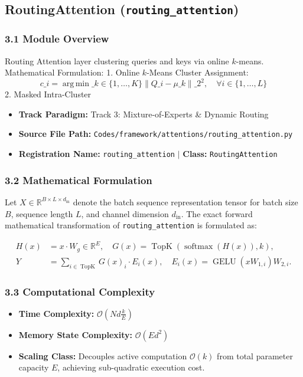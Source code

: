 \subsection{RoutingAttention (\texttt{routing\_attention})}
\label{sec:app_module_routing\_attention}

\subsubsection*{3.1 Module Overview}
Routing Attention layer clustering queries and keys via online $k$-means.  Mathematical Formulation:     1. Online $k$-Means Cluster Assignment:        $$c\_i = \operatorname{arg\,min}\_{k \in \{1, \dots, K\}} \|Q\_i - \mu\_k\|\_2^2, \quad \forall i \in \{1, \dots, L\}$$          2. Masked Intra-Cluster
\begin{itemize}
    \item \textbf{Track Paradigm:} Track 3: Mixture-of-Experts & Dynamic Routing
    \item \textbf{Source File Path:} \texttt{Codes/framework/attentions/routing\_attention.py}
    \item \textbf{Registration Name:} \texttt{routing\_attention} $\mid$ \textbf{Class:} \texttt{RoutingAttention}
\end{itemize}

\subsubsection*{3.2 Mathematical Formulation}
Let $X \in \mathbb{R}^{B \times L \times d_{\text{in}}}$ denote the batch sequence representation tensor for batch size $B$, sequence length $L$, and channel dimension $d_{\text{in}}$. The exact forward mathematical transformation of \texttt{routing\_attention} is formulated as:

\begin{align}
H(x) &= x \cdot W_g \in \mathbb{R}^{E}, \quad G(x) = \operatorname{TopK}\left(\operatorname{softmax}(H(x)), k\right), \\
Y &= \sum_{i \in \operatorname{TopK}} G(x)_i \cdot E_i(x), \quad E_i(x) = \operatorname{GELU}(x W_{1, i}) W_{2, i}.
\end{align}


\subsubsection*{3.3 Computational Complexity}
\begin{itemize}
    \item \textbf{Time Complexity:} $\mathcal{O}(N d \frac{k}{E})$
    \item \textbf{Memory State Complexity:} $\mathcal{O}(E d^2)$
    \item \textbf{Scaling Class:} Decouples active computation $\mathcal{O}(k)$ from total parameter capacity $E$, achieving sub-quadratic execution cost.
\end{itemize}

